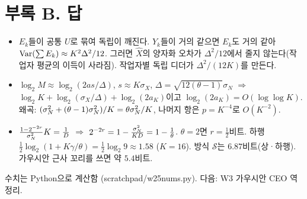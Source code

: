 \section*{부록 B. 답}
\begin{itemize}[leftmargin=2.2em]
\item[1.6] $E_k$들이 공통 $U$로 묶여 독립이 깨진다. $Y_k$들이 거의 같으면 $E_k$도 거의 같아 $\operatorname{Var}(\sum E_k)\approx K^2\Delta^2/12$. 그러면 $\hat X$의 양자화 오차가 $\Delta^2/12$에서 줄지 않는다(작업자 평균의 이득이 사라짐). 작업자별 독립 디더가 $\Delta^2/(12K)$를 만든다.
\item[5.1] $\log_2M\approx\log_2(2as/\Delta)$, $s\approx K\sigma_X$, $\Delta=\sqrt{12(\theta-1)}\sigma_N$ $\Rightarrow$ $\log_2K+\log_2(\sigma_X/\Delta)+\log_2(2a_K)$이고 $\log_2(2a_K)=O(\log\log K)$. 왜곡: $(\sigma_N^2+(\theta-1)\sigma_N^2)/K=\theta\sigma_N^2/K$, 나머지 항은 $p=K^{-4}$로 $O(K^{-2})$.
\item[5.2] $\frac{1-2^{-2r}}{\sigma_N^2}K=\frac1D$ $\Rightarrow$ $2^{-2r}=1-\frac{\sigma_N^2}{KD}=1-\frac1\theta$. $\theta=2$면 $r=\frac12$비트. 하행 $\frac12\log_2(1+K\gamma/\theta)=\frac12\log_2 9\approx1.58$ ($K=16$). 방식 $\mathcal S$는 $6.87$비트(상·하행). 가우시안 근사 꼬리를 쓰면 약 $5.4$비트.
\end{itemize}

\vspace{1em}
\small\textcolor{ink!60}{수치는 Python으로 계산함 (scratchpad/w25nums.py). 다음: W3 가우시안 CEO 역정리.}

